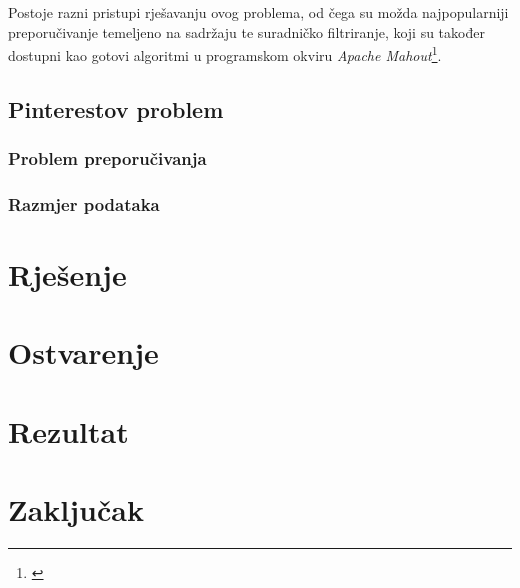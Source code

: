 \documentclass[times, utf8, seminar]{fer}
\begin{document}
Postoje razni pristupi rješavanju ovog problema, od čega su možda najpopularniji preporučivanje temeljeno na sadržaju te suradničko filtriranje, koji su također dostupni kao gotovi algoritmi u programskom okviru \textit{Apache Mahout}\footnote{\cite{rovkp-mahout}}.

\section{Pinterestov problem}

\subsection{Problem preporučivanja}

\subsection{Razmjer podataka}

\chapter{Rješenje}

\chapter{Ostvarenje}

\chapter{Rezultat}

\chapter{Zaključak}



\end{document}
